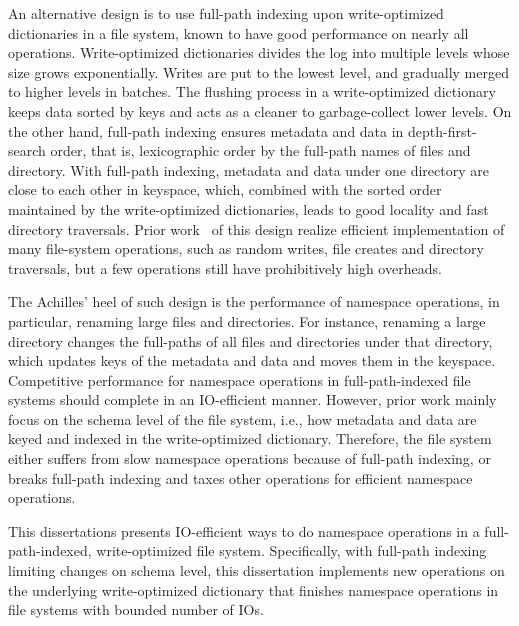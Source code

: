 An alternative design is to use full-path indexing upon write-optimized
dictionaries in a file system, known to have good performance on nearly all
operations.
Write-optimized dictionaries divides the log into multiple levels whose size
grows exponentially.
Writes are put to the lowest level, and gradually merged to higher levels in
batches.
The flushing process in a write-optimized dictionary keeps data sorted by keys
and acts as a cleaner to garbage-collect lower levels.
On the other hand, full-path indexing ensures metadata and data in
depth-first-search order, that is, lexicographic order by the full-path names
of files and directory.
With full-path indexing, metadata and data under one directory are close to each
other in keyspace, which, combined with the sorted order maintained by the
write-optimized dictionaries, leads to good locality and fast directory
traversals.
Prior work~\citep{betrfs1,betrfs1tos,betrfs2,betrfs2tos,betrfs3} of this design
realize efficient implementation of many file-system operations, such as random
writes, file creates and directory traversals,
but a few operations still have prohibitively high overheads.

The Achilles' heel of such design is the performance of namespace operations,
in particular, renaming large files and directories.
For instance, renaming a large directory changes the full-paths of all files
and directories under that directory, which updates keys of the metadata and
data and moves them in the keyspace.
Competitive performance for namespace operations in full-path-indexed file
systems should complete in an IO-efficient manner.
However, prior work mainly focus on the schema level of the file system, i.e.,
how metadata and data are keyed and indexed in the write-optimized dictionary.
Therefore, the file system either suffers from slow namespace operations because
of full-path indexing, or breaks full-path indexing and
taxes other operations for efficient namespace operations.

This dissertations presents IO-efficient ways to do namespace operations in a
full-path-indexed, write-optimized file system.
Specifically, with full-path indexing limiting changes on schema level,
this dissertation implements new operations on the underlying write-optimized
dictionary that finishes namespace operations in file systems with bounded
number of IOs.

